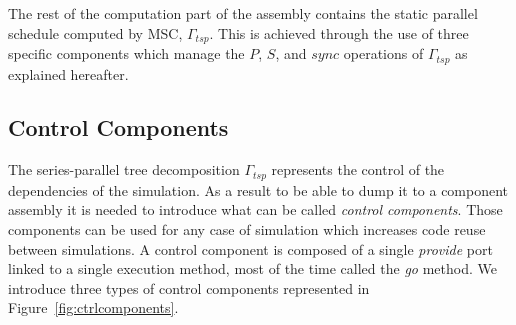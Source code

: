 
The rest of the computation part of the assembly contains the static parallel schedule
computed by MSC, \ie $\Gamma_{tsp}$. This is achieved through the use of
three specific components which manage the $P$, $S$, and $sync$
operations of $\Gamma_{tsp}$ as explained hereafter.

\subsection{Control Components}
The series-parallel tree decomposition $\Gamma_{tsp}$ represents the
control of the dependencies of the simulation. As a result to be able
to dump it to a component assembly it is needed to introduce what can
be called \emph{control components}. Those components can be used for
any case of simulation which increases code reuse between
simulations. A control component is composed of a single
\emph{provide} port linked to a single execution method, most of the
time called the \emph{go} method. We introduce three types of control
components represented in Figure~\ref{fig:ctrlcomponents}.

